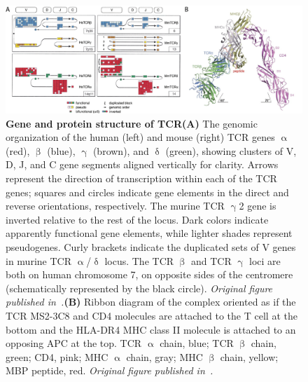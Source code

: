 \begin{figure}[ht!]
    \centering    
    \includegraphics[width=1.0\textwidth]{Chapter1/Figs/chap1_fig2.png} %
    \caption[Gene and protein structure of TCR]{\textbf{Gene and protein structure of TCR}\newline\textbf{(A)} The genomic organization of the human (left) and mouse (right) TCR genes ${\upalpha}$ (red), ${\upbeta}$ (blue), ${\upgamma}$ (brown), and ${\updelta}$ (green), showing clusters of V, D, J, and C gene segments aligned vertically for clarity. Arrows represent the direction of transcription within each of the TCR genes; squares and circles indicate gene elements in the direct and reverse orientations, respectively. The murine TCR ${\upgamma}$2 gene is inverted relative to the rest of the locus. Dark colors indicate apparently functional gene elements, while lighter shades represent pseudogenes. Curly brackets indicate the duplicated sets of V genes in murine TCR ${\upalpha}$/${\updelta}$ locus. The TCR ${\upbeta}$ and TCR ${\upgamma}$ loci are both on human chromosome 7, on opposite sides of the centromere (schematically represented by the black circle). \textit{Original figure published in~\citep{glusman_comparative_2001}.}\newline\textbf{(B)} Ribbon diagram of the complex oriented as if the TCR MS2-3C8 and CD4 molecules are attached to the T cell at the bottom and the HLA-DR4 MHC class II molecule is attached to an opposing APC at the top. TCR ${\upalpha}$ chain, blue; TCR ${\upbeta}$ chain, green; CD4, pink; MHC ${\upalpha}$ chain, gray; MHC ${\upbeta}$ chain, yellow; MBP peptide, red. \textit{Original figure published in~\citep{yin_crystal_2012}.}}
    \label{fig:chap1_fig2}
\end{figure}


